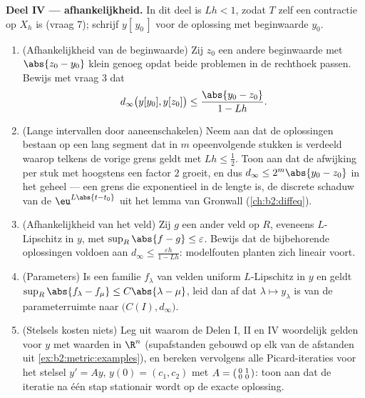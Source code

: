 \begin{problem}
\medskip
\noindent\textbf{Deel IV ---  afhankelijkheid.} In dit deel
is $Lh < 1$, zodat $T$ zelf een contractie op $X_h$ is (vraag 7);
schrijf $y[\,y_0\,]$ voor de oplossing met beginwaarde $y_0$.
\begin{enumerate}[resume]
  \item (Afhankelijkheid van de beginwaarde) Zij $z_0$ een andere
        beginwaarde met $\abs{z_0 - y_0}$ klein genoeg opdat beide
        problemen in de rechthoek passen. Bewijs met vraag 3 dat
        \[
        d_\infty\bigl(y[y_0], y[z_0]\bigr) \leq
        \frac{\abs{y_0 - z_0}}{1 - Lh}.
        \]
  \item (Lange intervallen door aaneenschakelen) Neem aan dat de
        oplossingen bestaan op een lang segment dat in $m$
        opeenvolgende stukken is verdeeld waarop telkens de
        vorige grens geldt met $Lh \leq \frac12$. Toon aan dat de
        afwijking per stuk met hoogstens een factor $2$ groeit,
        en dus $d_\infty \leq 2^m\abs{y_0 - z_0}$ in het geheel
        --- een grens die exponentieel in de lengte is, de
        discrete schaduw van de $\eu^{L\abs{t - t_0}}$ uit het
        lemma van Gronwall (\cref{ch:b2:diffeq}).
  \item (Afhankelijkheid van het veld) Zij $g$ een ander veld op
        $R$, eveneens $L$-Lipschitz in $y$, met $\sup_R \abs{f -
        g} \leq \varepsilon$. Bewijs dat de bijbehorende
        oplossingen voldoen aan $d_\infty \leq \frac{\varepsilon
        h}{1 - Lh}$: modelfouten planten zich lineair voort.
  \item (Parameters) Is een familie $f_\lambda$ van velden
        uniform $L$-Lipschitz in $y$ en geldt
        $\sup_R\abs{f_\lambda - f_\mu} \leq C\abs{\lambda -
        \mu}$, leid dan af dat $\lambda \mapsto y_\lambda$
         is van de parameterruimte naar $\bigl(C(I),
        d_\infty\bigr)$.
  \item (Stelsels kosten niets) Leg uit waarom de Delen I, II en
        IV woordelijk gelden voor $y$ met waarden in $\R^n$
        (supafstanden gebouwd op elk van de afstanden uit
        \cref{ex:b2:metric:examples}), en bereken vervolgens alle
        Picard-iteraties voor het stelsel $y' = Ay$, $y(0) =
        (c_1, c_2)$ met $A = \begin{psmallmatrix} 0 & 1\\ 0 &
        0\end{psmallmatrix}$: toon aan dat de iteratie na één stap
        stationair wordt op de exacte oplossing.
\end{enumerate}


\end{problem}
